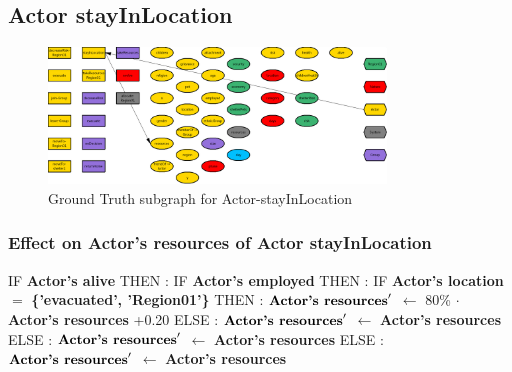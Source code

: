 \documentclass{article}%
\begin{document}
%
\subsection{Actor stayInLocation}%
\label{subsec:Actor stayInLocation}%


\begin{figure}[ht]%
\centering%
\includegraphics[width=0.8\textwidth]{images/Actor-stayInLocation.png}%
\caption{Ground Truth subgraph for Actor{-}stayInLocation}%
\end{figure}

%
\subsubsection{Effect on Actor's resources of Actor stayInLocation}%
\label{ssubsec:Effect on Actor's resources of Actor stayInLocation}%
\begin{flushleft}%
IF %
\textbf{Actor's alive}%
\linebreak%
\hspace*{2em}%
THEN %
: %
IF %
\textbf{Actor's employed}%
\linebreak%
\hspace*{4em}%
THEN %
: %
IF %
\textbf{Actor's location}%
$=$%
\textbf{\{'evacuated', 'Region01'\}}%
\linebreak%
\hspace*{6em}%
THEN %
: %
$\mbox{\textbf{Actor's resources}} '$%
$\leftarrow$%
80\%%
$\cdot$%
\textbf{Actor's resources}%
+0.20%
\linebreak%
\hspace*{6em}%
ELSE %
: %
$\mbox{\textbf{Actor's resources}} '$%
$\leftarrow$%
\textbf{Actor's resources}%
\linebreak%
\hspace*{4em}%
ELSE %
: %
$\mbox{\textbf{Actor's resources}} '$%
$\leftarrow$%
\textbf{Actor's resources}%
\linebreak%
\hspace*{2em}%
ELSE %
: %
$\mbox{\textbf{Actor's resources}} '$%
$\leftarrow$%
\textbf{Actor's resources}%
\end{flushleft}
\end{document}
